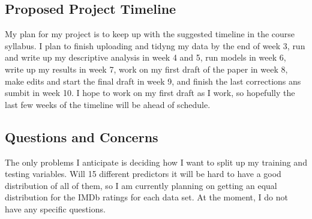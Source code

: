\documentclass[
]{article}
\begin{document}
\hypertarget{proposed-project-timeline}{%
\subsection{Proposed Project Timeline}\label{proposed-project-timeline}}

My plan for my project is to keep up with the suggested timeline in the
course syllabus. I plan to finish uploading and tidyng my data by the
end of week 3, run and write up my descriptive analysis in week 4 and 5,
run models in week 6, write up my results in week 7, work on my first
draft of the paper in week 8, make edits and start the final draft in
week 9, and finish the last corrections ans sumbit in week 10. I hope to
work on my first draft as I work, so hopefully the last few weeks of the
timeline will be ahead of schedule.

\hypertarget{questions-and-concerns}{%
\subsection{Questions and Concerns}\label{questions-and-concerns}}

The only problems I anticipate is deciding how I want to split up my
training and testing variables. Will 15 different predictors it will be
hard to have a good distribution of all of them, so I am currently
planning on getting an equal distribution for the IMDb ratings for each
data set. At the moment, I do not have any specific questions.
\end{document}
